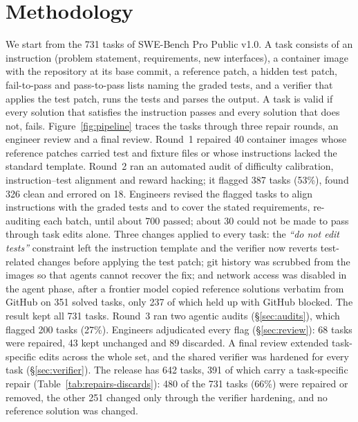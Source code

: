 \section{Methodology}
\label{sec:method}

We start from the 731 tasks of SWE-Bench Pro Public v1.0. A task consists of an instruction (problem statement, requirements, new interfaces), a container image with the repository at its base commit, a reference patch, a hidden test patch, fail-to-pass and pass-to-pass lists naming the graded tests, and a verifier that applies the test patch, runs the tests and parses the output. A task is valid if every solution that satisfies the instruction passes and every solution that does not, fails. Figure~\ref{fig:pipeline} traces the tasks through three repair rounds, an engineer review and a final review. Round~1 repaired 40 container images whose reference patches carried test and fixture files or whose instructions lacked the standard template. Round~2 ran an automated audit of difficulty calibration, instruction--test alignment and reward hacking; it flagged 387 tasks (53\%), found 326 clean and errored on 18. Engineers revised the flagged tasks to align instructions with the graded tests and to cover the stated requirements, re-auditing each batch, until about 700 passed; about 30 could not be made to pass through task edits alone. Three changes applied to every task: the \textit{``do not edit tests''} constraint left the instruction template and the verifier now reverts test-related changes before applying the test patch; git history was scrubbed from the images so that agents cannot recover the fix; and network access was disabled in the agent phase, after a frontier model copied reference solutions verbatim from GitHub on 351 solved tasks, only 237 of which held up with GitHub blocked. The result kept all 731 tasks. Round~3 ran two agentic audits (\S\ref{sec:audits}), which flagged 200 tasks (27\%). Engineers adjudicated every flag (\S\ref{sec:review}): 68 tasks were repaired, 43 kept unchanged and 89 discarded. A final review extended task-specific edits across the whole set, and the shared verifier was hardened for every task (\S\ref{sec:verifier}). The release has 642 tasks, 391 of which carry a task-specific repair (Table~\ref{tab:repairs-discards}): 480 of the 731 tasks (66\%) were repaired or removed, the other 251 changed only through the verifier hardening, and no reference solution was changed.

